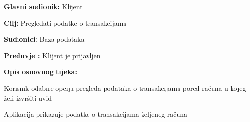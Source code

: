     			\noindent {}
    			\begin{packed_item}
    				
    				\item \textbf{Glavni sudionik: }Klijent
    				\item  \textbf{Cilj:} Pregledati podatke o transakcijama
    				\item  \textbf{Sudionici:} Baza podataka
    				\item  \textbf{Preduvjet:} Klijent je prijavljen
    				\item  \textbf{Opis osnovnog tijeka:}
    				
    				\item[] \begin{packed_enum}
    					
    					\item Korisnik odabire opciju pregleda podataka o transakcijama pored računa u kojeg želi izvršiti uvid
    					\item Aplikacija prikazuje podatke o transakcijama željenog računa
    					
    				\end{packed_enum}
    				
    			\end{packed_item}
    		
